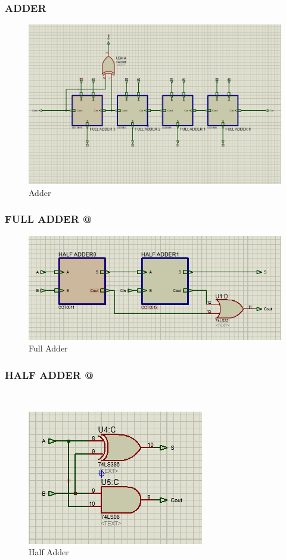 \documentclass{article}
\begin{document}
\subsubsection{ADDER}
\begin{figure}[!h]
    \centering
    \includegraphics[scale=0.5]{Adder.PNG}
    \caption{Adder}
    \label{fig:Adder}
\end{figure}

\subsubsection{FULL ADDER @}
\begin{figure}[!h]
    \centering
    \includegraphics[scale=0.75]{Full-Adder.PNG}
    \caption{Full Adder}
    \label{fig:Full-Adder}
\end{figure}

\subsubsection{HALF ADDER @} 
\begin{figure}[!h]
    \centering
    \includegraphics{Half-Adder.PNG}
    \caption{Half Adder}
    \label{fig:Half-Adder}
\end{figure}
\end{document}
